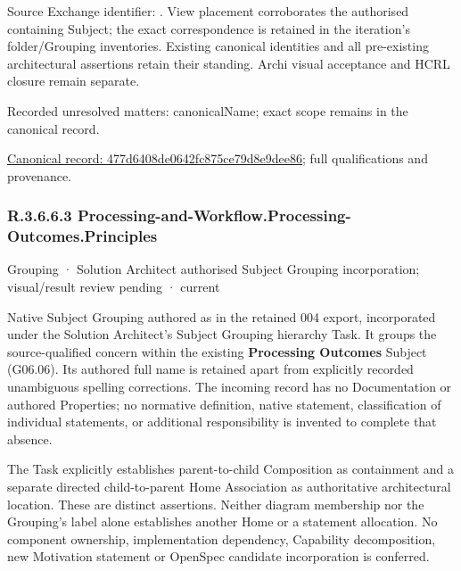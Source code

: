 Source Exchange identifier: \texttt{}. View placement corroborates
the authorised containing Subject; the exact correspondence is retained in the
iteration's folder/Grouping inventories. Existing canonical identities and all
pre-existing architectural assertions retain their standing. Archi visual
acceptance and HCRL closure remain separate.


{\small Recorded unresolved matters: canonicalName; exact scope remains in the canonical record.}\par
{\footnotesize \href{../../../../continuum/grouping/477d6408de0642fc875ce79d8e9dee86.md}{Canonical record: 477d6408de0642fc875ce79d8e9dee86}; full qualifications and provenance.}\par
\subsubsection*{R.3.6.6.3 Processing-and-Workflow.Processing-Outcomes.Principles}
\label{navigation:R.3.6.6.3}

\label{element:5a4a41f263424c1aac14102b64f95bd0}
{\small Grouping · Solution Architect authorised Subject Grouping incorporation; visual/result review pending · current}\par

Native Subject Grouping authored as \texttt{} in the retained 004 export,
incorporated under the Solution Architect's Subject Grouping hierarchy Task.
It groups the source-qualified \texttt{} concern within
the existing \textbf{Processing Outcomes} Subject (G06.06). Its authored full name
is retained apart from explicitly recorded unambiguous spelling corrections.
The incoming record has no Documentation or authored Properties; no normative
definition, native statement, classification of individual statements, or
additional responsibility is invented to complete that absence.



The Task explicitly establishes parent-to-child Composition as containment and
a separate directed child-to-parent Home Association as authoritative architectural
location. These are distinct assertions. Neither diagram membership nor the
Grouping's label alone establishes another Home or a statement allocation.
No component ownership, implementation dependency, Capability decomposition,
new Motivation statement or OpenSpec candidate incorporation is conferred.



